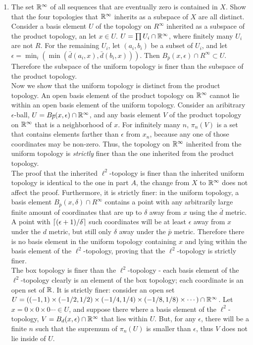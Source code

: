 \documentclass[12pt,letterpaper]{article}
\begin{document}
\begin{enumerate}
\begin{enumerate}
    \item The set $\mathbb{R}^\infty$ of all sequences that are eventually zero is contained in $X$. Show that the four topologies that $\mathbb{R}^\infty$ inherits as a subspace of $X$ are all distinct. \\
    Consider a basis element $U$ of the topology on $R^\infty$ inherited as a subspace of the product topology, an let $x\in U$. $U=\prod U_i \cap \mathbb{R}^\infty$, where finitely many $U_i$ are not $R$. For the remaining $U_i$, let $(a_i,b_i)$ be a subset of $U_i$, and let $\epsilon = \min_i(\min(\bar{d}(a_i,x), \bar{d}(b_i,x)))$. Then $B_{\bar{p}}(x,\epsilon) \cap R^\infty \subset U$. Therefore the subspace of the uniform topology is finer than the subspace of the product topology. \\
    Now we show that the uniform topology is distinct from the product topology. An open basis element of the product topology on $\mathbb{R}^\infty$ cannot lie within an open basis element of the uniform topology. Consider an aribitrary $\epsilon$-ball, $U=B_{\bar{p}}(x,\epsilon) \cap \R^\infty$, and any basis element $V$ of the product topology on $\mathbb{R}^\infty$ that is a neighborhood of $x$. For infinitely many $n$, $\pi_n(V)$ is a set that contains elements farther than $\epsilon$ from $x_n$, because any one of those coordinates may be non-zero. Thus, the topology on $\mathbb{R}^\infty$ inherited from the uniform topology is \emph{strictly} finer than the one inherited from the product topology. \\
    The proof that the inherited $\ell^2$-topology is finer than the inherited uniform topology is identical to the one in part $A$, the change from $X$ to $\mathbb{R}^\infty$ does not affect the proof. Furthermore, it is strictly finer: in the uniform topology, a basis element $B_{\bar{p}}(x,\delta) \cap R^\infty$ contains a point with any arbitrarily large finite amount of coordinates that are up to $\delta$ away from $x$ using the $\bar{d}$ metric. A point with $\lceil(\epsilon+1)/\delta\rceil$ such coordinates will be at least $\epsilon$ away from $x$ under the $d$ metric, but still only $\delta$ away under the $\bar{p}$ metric. Therefore there is no basis element in the uniform topology containing $x$ and lying within the basis element of the $\ell^2$-topology, proving that the $\ell^2$-topology is strictly finer.\\
    The box topology is finer than the $\ell^2$-topology - each basis element of the $\ell^2$-topology clearly is an element of the box topology; each coordinate is an open set of $\mathbb{R}$. It is strictly finer: consider an open set $U=((-1,1)\times(-1/2,1/2)\times(-1/4,1/4)\times(-1/8,1/8)\times\cdots)\cap \mathbb{R}^\infty$. Let $x=0\times0\times0\cdots \in U$, and suppose there where a basis element of the $\ell^2$-topology, $V=B_d(x,\epsilon)\cap \mathbb{R}^\infty$ that lies within $U$. But, for any $\epsilon$, there will be a finite $n$ such that the supremum of $\pi_n(U)$ is smaller than $\epsilon$, thus $V$ does not lie inside of $U$.

\end{enumerate}
\end{enumerate}
\end{document}
